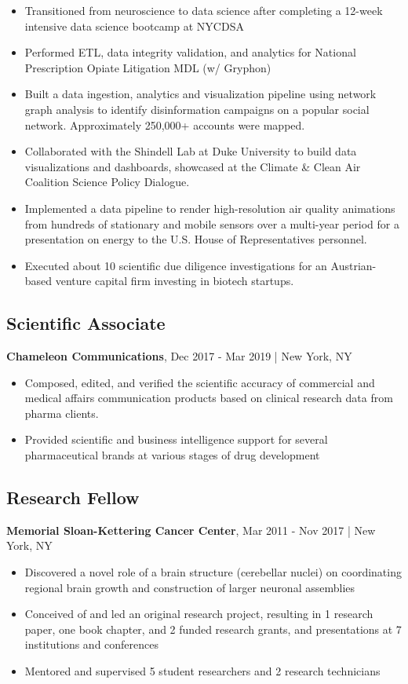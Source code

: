 \documentclass[11pt]{article}
\newenvironment{myitemize}
{ \begin{itemize}
	\setlength{\itemsep}{0pt}
	\setlength{\parskip}{0pt}
	\setlength{\parsep}{0pt}     }
{ \end{itemize}                  }
\begin{document}
\begin{myitemize}
	\item Transitioned from neuroscience to data science after completing a 12-week intensive data science bootcamp at NYCDSA 
	\item Performed ETL, data integrity validation, and analytics for National Prescription Opiate Litigation MDL (w/ Gryphon)
	\item Built a data ingestion, analytics and visualization pipeline using network graph analysis to identify disinformation campaigns on a popular social network. Approximately 250,000+ accounts were mapped.
	\item Collaborated with the Shindell Lab at Duke University to build data visualizations and dashboards, showcased at the Climate \& Clean Air Coalition Science Policy Dialogue.
	\item Implemented a data pipeline to render high-resolution air quality animations from hundreds of stationary and mobile sensors over a multi-year period for a presentation on energy to the U.S. House of Representatives personnel. 
	\item Executed about 10 scientific due diligence investigations for an Austrian-based venture capital firm investing in biotech startups.
\end{myitemize}

\subsection*{Scientific Associate}
\vspace{-3truemm}
{\bfseries Chameleon Communications}, Dec 2017 - Mar 2019 | New York, NY
\begin{myitemize}
	\item Composed, edited, and verified the scientific accuracy of commercial and medical affairs communication products based on clinical research data from pharma clients.
	\item Provided scientific and business intelligence support for several pharmaceutical brands at various stages of drug development
\end{myitemize}

\subsection*{Research Fellow}
\vspace{-3truemm}
{\bfseries Memorial Sloan-Kettering Cancer Center}, Mar 2011 - Nov 2017 | New York, NY
\begin{myitemize}
	\item Discovered a novel role of a brain structure (cerebellar nuclei) on coordinating regional brain growth and construction of larger neuronal assemblies
	\item Conceived of and led an original research project, resulting in 1 research paper, one book chapter, and 2 funded research grants, and presentations at 7 institutions and conferences
	\item Mentored and supervised 5 student researchers and 2 research technicians
\end{myitemize}
\end{document}
